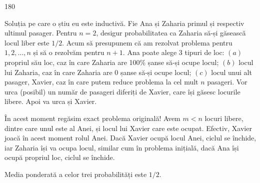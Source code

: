 \documentclass[../main.tex]{subfiles}
\begin{document}
\begin{turn}{180}
  \begin{minipage}{\linewidth}
    Soluția pe care o știu eu este inductivă. Fie Ana și Zaharia primul și respectiv ultimul pasager. Pentru $n=2$, desigur probabilitatea ca Zaharia să-și găsească locul liber este $1/2$. Acum să presupunem că am rezolvat problema pentru $1, 2, \dots, n$ și să o rezolvăm pentru $n+1$. Ana poate alege 3 tipuri de loc: $(a)$ propriul său loc, caz în care Zaharia are 100\% șanse să-și ocupe locul; $(b)$ locul lui Zaharia, caz în care Zaharia are 0 șanse să-și ocupe locul; $(c)$ locul unui alt pasager, Xavier, caz în care putem reduce problema la cel mult $n$ pasageri. Vor urca (posibil) un număr de pasageri diferiți de Xavier, care își găsesc locurile libere. Apoi va urca și Xavier.

    În acest moment regăsim exact problema originală! Avem $m < n$ locuri libere, dintre care unul este al Anei, și locul lui Xavier care este ocupat. Efectiv, Xavier joacă în acest moment rolul Anei. Dacă Xavier ocupă locul Anei, ciclul se închide, iar Zaharia își va ocupa locul, similar cum în problema inițială, dacă Ana își ocupă propriul loc, ciclul se închide.

    Media ponderată a celor trei probabilități este $1/2$.
  \end{minipage}
\end{turn}
\end{document}

